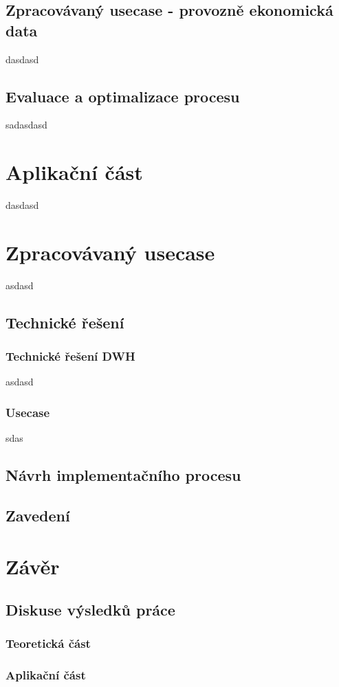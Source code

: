 \documentclass[
  digital,     %
  twoside,     %
  lof,         %
  lot,         %
]{fithesis4}
\begin{document}
\section{Zpracovávaný usecase - provozně ekonomická data}
dasdasd

\section{Evaluace a optimalizace procesu}
sadasdasd

\chapter{Aplikační část}
dasdasd

\chapter{Zpracovávaný usecase}
asdasd

\section{Technické řešení}
\subsection{Technické řešení DWH}
asdasd
\subsection{Usecase}
sdas

\section{Návrh implementačního procesu}
\section{Zavedení}

\chapter{Závěr}
\section{Diskuse výsledků práce}
\subsection{Teoretická část}
\subsection{Aplikační část}
\end{document}
